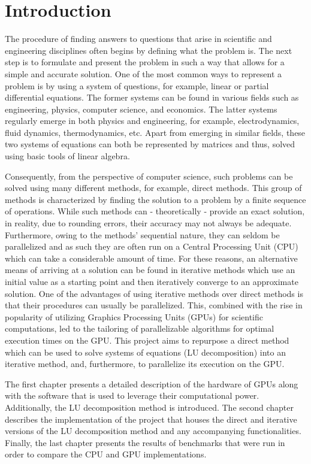 \chapter*{Introduction \TO}		 		 %

The procedure of finding answers to questions that arise in scientific and engineering disciplines often begins by defining what the problem is. The next step is to formulate and present the problem in such a way that allows for a simple and accurate solution. One of the most common ways to represent a problem is by using a system of questions, for example, linear or partial differential equations. The former systems can be found in various fields such as engineering, physics, computer science, and economics. The latter systems regularly emerge in both physics and engineering, for example, electrodynamics, fluid dynamics, thermodynamics, etc. Apart from emerging in similar fields, these two systems of equations can both be represented by matrices and thus, solved using basic tools of linear algebra.
\par Consequently, from the perspective of computer science, such problems can be solved using many different methods, for example, direct methods. This group of methods is characterized by finding the solution to a problem by a finite sequence of operations. While such methods can - theoretically - provide an exact solution, in reality, due to rounding errors, their accuracy may not always be adequate. Furthermore, owing to the methods' sequential nature, they can seldom be parallelized and as such they are often run on a Central Processing Unit (CPU) which can take a considerable amount of time. For these reasons, an alternative means of arriving at a solution can be found in iterative methods which use an initial value as a starting point and then iteratively converge to an approximate solution. One of the advantages of using iterative methods over direct methods is that their procedures can usually be parallelized. This, combined with the rise in popularity of utilizing Graphics Processing Units (GPUs) for scientific computations, led to the tailoring of parallelizable algorithms for optimal execution times on the GPU. This project aims to repurpose a direct method which can be used to solve systems of equations (LU decomposition) into an iterative method, and, furthermore, to parallelize its execution on the GPU.
\par The first chapter presents a detailed description of the hardware of GPUs along with the software that is used to leverage their computational power. Additionally, the LU decomposition method is introduced. The second chapter describes the implementation of the project that houses the direct and iterative versions of the LU decomposition method and any accompanying functionalities. Finally, the last chapter presents the results of benchmarks that were run in order to compare the CPU and GPU implementations.